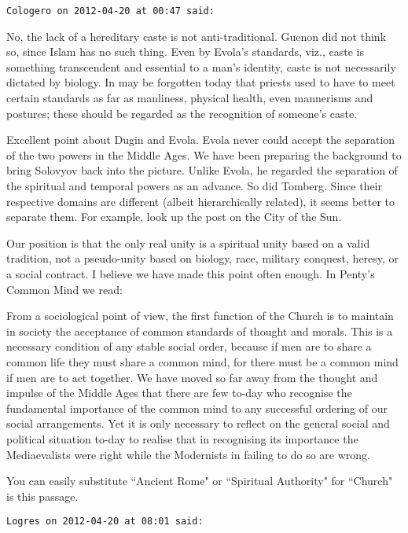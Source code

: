 \begin{footnotesize}
\begin{sffamily}
\hfill

\texttt{Cologero on 2012-04-20 at 00:47 said: }

No, the lack of a hereditary caste is not anti-traditional. Guenon did not think so, since Islam has no such thing. Even by Evola's standards, viz., caste is something transcendent and essential to a man's identity, caste is not necessarily dictated by biology. In may be forgotten today that priests used to have to meet certain standards as far as manliness, physical health, even mannerisms and postures; these should be regarded as the recognition of someone's caste.

Excellent point about Dugin and Evola. Evola never could accept the separation of the two powers in the Middle Ages. We have been preparing the background to bring Solovyov back into the picture. Unlike Evola, he regarded the separation of the spiritual and temporal powers as an advance. So did Tomberg. Since their respective domains are different (albeit hierarchically related), it seems better to separate them. For example, look up the post on the City of the Sun.

Our position is that the only real unity is a spiritual unity based on a valid tradition, not a pseudo-unity based on biology, race, military conquest, heresy, or a social contract. I believe we have made this point often enough. In Penty's Common Mind we read:

\begin{quotex}
From a sociological point of view, the first function of the Church is to maintain in society the acceptance of common standards of thought and morals. This is a necessary condition of any stable social order, because if men are to share a common life they must share a common mind, for there must be a common mind if men are to act together. We have moved so far away from the thought and impulse of the Middle Ages that there are few to-day who recognise the fundamental importance of the common mind to any successful ordering of our social arrangements. Yet it is only necessary to reflect on the general social and political situation to-day to realise that in recognising its importance the Mediaevalists were right while the Modernists in failing to do so are wrong. 

\end{quotex}
You can easily substitute ``Ancient Rome" or ``Spiritual Authority" for ``Church" is this passage.

\hfill

\texttt{Logres on 2012-04-20 at 08:01 said: }


\end{sffamily}
\end{footnotesize}
